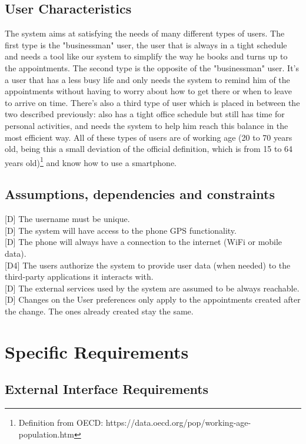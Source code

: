 \documentclass[12pt]{article}
\begin{document}
\subsection{User Characteristics}
The system aims at satisfying the needs of many different types of users. The first type is the "businessman" user, the user that is always in a tight schedule and needs a tool like our system to simplify the way he books and turns up to the appointments. The second type is the opposite of the "businessman" user. It's a user that has a less busy life and only needs the system to remind him of the appointments without having to worry about how to get there or when to leave to arrive on time. There's also a third type of user which is placed in between the two described previously: also has a tight office schedule but still has time for personal activities, and needs the system to help him reach this balance in the most efficient way.
All of these types of users are of working age (20 to 70 years old, being this a small deviation of the official definition, which is from 15 to 64 years old)\footnote{Definition from OECD: https://data.oecd.org/pop/working-age-population.htm} and know how to use a smartphone.

\subsection{Assumptions, dependencies and constraints}
[D] The username must be unique.\\{}
[D] The system will have access to the phone GPS functionality.\\{}
[D] The phone will always have a connection to the internet (WiFi or mobile data).\\{}
[D4] The users authorize the system to provide user data (when needed) to the third-party applications it interacts with.\\{}
[D] The external services used by the system are assumed to be always reachable.\\{}
[D] Changes on the User preferences only apply to the appointments created after the change. The ones already created stay the same.\\{}


\section{Specific Requirements}

\subsection{External Interface Requirements}
\end{document}
